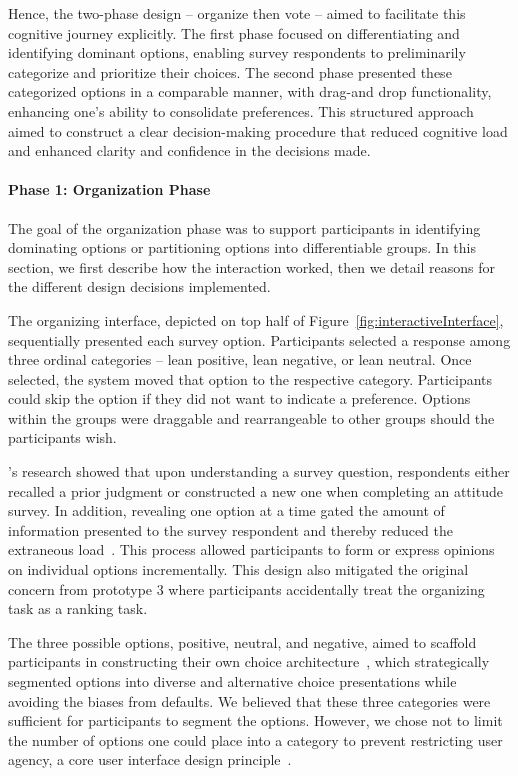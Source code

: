 Hence, the two-phase design -- organize then vote -- aimed to facilitate this cognitive journey explicitly. The first phase focused on differentiating and identifying dominant options, enabling survey respondents to preliminarily categorize and prioritize their choices. The second phase presented these categorized options in a comparable manner, with drag-and drop functionality, enhancing one's ability to consolidate preferences. This structured approach aimed to construct a clear decision-making procedure that reduced cognitive load and enhanced clarity and confidence in the decisions made.

\paragraph{Phase 1: Organization Phase}
The goal of the organization phase was to support participants in identifying dominating options or partitioning options into differentiable groups. In this section, we first describe how the interaction worked, then we detail reasons for the different design decisions implemented.

The organizing interface, depicted on top half of Figure~\ref{fig:interactiveInterface}, sequentially presented each survey option. Participants selected a response among three ordinal categories -- lean positive, lean negative, or lean neutral. Once selected, the system moved that option to the respective category. Participants could skip the option if they did not want to indicate a preference. Options within the groups were draggable and rearrangeable to other groups should the participants wish.

\textcite{strackThinkingJudgingCommunicating1987}'s research showed that upon understanding a survey question, respondents either recalled a prior judgment or constructed a new one when completing an attitude survey. In addition, revealing one option at a time gated the amount of information presented to the survey respondent and thereby reduced the extraneous load~\cite{swellerCognitiveLoadTheory2011}. This process allowed participants to form or express opinions on individual options incrementally. This design also mitigated the original concern from prototype 3 where participants accidentally treat the organizing task as a ranking task.

The three possible options, positive, neutral, and negative, aimed to scaffold participants in constructing their own choice architecture~\cite{munscherReviewTaxonomyChoice2016, thalerNudgeImprovingDecisions2008a}, which strategically segmented options into diverse and alternative choice presentations while avoiding the biases from defaults. We believed that these three categories were sufficient for participants to segment the options. However, we chose not to limit the number of options one could place into a category to prevent restricting user agency, a core user interface design principle~\cite{norman2013design}.

